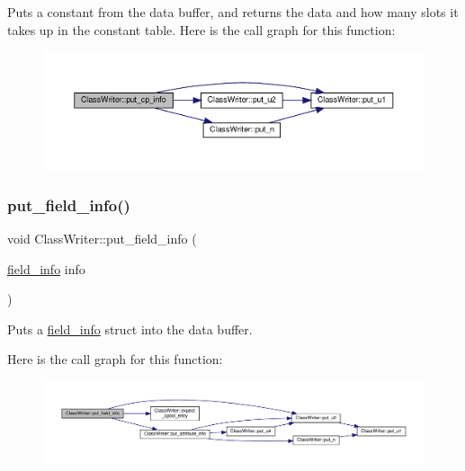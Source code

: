 Puts a constant from the data buffer, and returns the data and how many slots it takes up in the constant table. Here is the call graph for this function\+:\nopagebreak
\begin{figure}[H]
\begin{center}
\leavevmode
\includegraphics[width=350pt]{classClassWriter_a47741e12ae2af256ce3a58a41b2d04d6_cgraph}
\end{center}
\end{figure}
\mbox{\label{classClassWriter_adfc5adcd821436ff9e399efac367c071}} 
\subsubsection{\texorpdfstring{put\+\_\+field\+\_\+info()}{put\_field\_info()}}
{\footnotesize\ttfamily void Class\+Writer\+::put\+\_\+field\+\_\+info (\begin{DoxyParamCaption}\item[{\hyperlink{structfield__info}{field\+\_\+info}}]{info }\end{DoxyParamCaption})\hspace{0.3cm}{\ttfamily [private]}}



Puts a \hyperlink{structfield__info}{field\+\_\+info} struct into the data buffer. 

Here is the call graph for this function\+:\nopagebreak
\begin{figure}[H]
\begin{center}
\leavevmode
\includegraphics[width=350pt]{classClassWriter_adfc5adcd821436ff9e399efac367c071_cgraph}
\end{center}
\end{figure}
\mbox{\label{classClassWriter_a3221090999bef5f0e05993de89600670}} 
